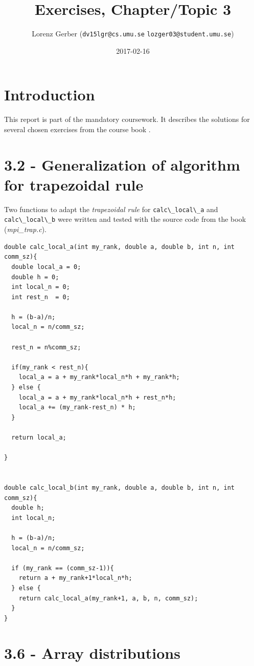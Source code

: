 \documentclass[a4paper,11pt,twoside]{article}
\title{Exercises, Chapter/Topic 3}
\author{Lorenz Gerber ({\tt{dv15lgr@cs.umu.se}} {\tt{lozger03@student.umu.se}})}
\date{2017-02-16}
\begin{document}
\lstset{language=C}
\maketitle
\thispagestyle{empty}
\newpage
\tableofcontents
\thispagestyle{empty}
\newpage

\clearpage
{}

\section{Introduction}
This report is part of the mandatory coursework. It describes the solutions for several chosen exercises from the course book \cite{pacheco2011}.

\section{3.2 - Generalization of algorithm for trapezoidal rule}
Two functions to adapt the \textit{trapezoidal rule} for \verb+calc\_local\_a+ and \verb+calc\_local\_b+ were written and tested with the source code from the book (\textit{mpi\_trap.c}).

\begin{verbatim}
double calc_local_a(int my_rank, double a, double b, int n, int comm_sz){
  double local_a = 0;
  double h = 0;
  int local_n = 0;
  int rest_n  = 0;

  h = (b-a)/n;
  local_n = n/comm_sz;

  rest_n = n%comm_sz;

  if(my_rank < rest_n){
    local_a = a + my_rank*local_n*h + my_rank*h;
  } else {
    local_a = a + my_rank*local_n*h + rest_n*h;
    local_a += (my_rank-rest_n) * h;
  }

  return local_a;

}


double calc_local_b(int my_rank, double a, double b, int n, int comm_sz){
  double h;
  int local_n;

  h = (b-a)/n;
  local_n = n/comm_sz;

  if (my_rank == (comm_sz-1)){
    return a + my_rank+1*local_n*h;
  } else {
    return calc_local_a(my_rank+1, a, b, n, comm_sz);
  }
}

\end{verbatim}

\section{3.6 - Array distributions}
\end{document}
